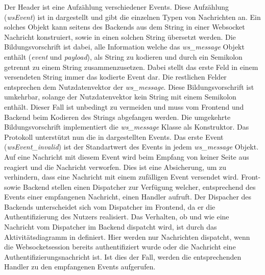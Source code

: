 Der Header ist eine Aufzählung verschiedener Events. 
Diese Aufzählung (\emph{wsEvent}) ist in  dargestellt und gibt die einzelnen Typen von Nachrichten an. 
Ein solches Objekt kann seitens des Backends aus dem String in einer Websocket Nachricht konstruiert, 
sowie in einen solchen String übersetzt werden. 
Die Bildungsvorschrift ist dabei, alle Information welche das \emph{ws\_message} Objekt enthält (\emph{event} und \emph{payload}), als String zu kodieren 
und durch ein Semikolon getrennt zu einem String zusammenzusetzen.
Dabei stellt das erste Feld in einem versendeten String immer das kodierte Event dar. Die restlichen Felder entsprechen dem Nutzdatenvektor der \emph{ws\_message}.
Diese Bildungsvorschrift ist umkehrbar, solange der Nutzdatenvektor kein String mit einem Semikolon enthält.
Dieser Fall ist unbedingt zu vermeiden und muss vom Frontend und Backend beim Kodieren des Strings abgefangen werden.
Die umgekehrte Bildungsvorschrift implementiert die \emph{ws\_message} Klasse als Konstruktor. 
Das Protokoll unterstützt nun die in  dargestellten Events.
Das erste Event (\emph{wsEvent\_invalid}) ist der Standartwert des Events in jedem \emph{ws\_message} Objekt. 
Auf eine Nachricht mit diesem Event wird beim Empfang von keiner Seite aus reagiert und die Nachricht verworfen.
Dies ist eine Absicherung, um zu verhindern, dass eine Nachricht mit einem zufälligen Event versendet wird.
Front- sowie Backend stellen einen Dispatcher zur Verfügung welcher, entsprechend des Events einer empfangenen Nachricht, einen Handler aufruft.
Der Dispacher des Backends unterscheidet sich vom Dispatcher im Frontend, da er die Authentifizierung des Nutzers realisiert.
Das Verhalten, ob und wie eine Nachricht vom Dispatcher im Backend dispatcht wird, 
ist durch das Aktivitätsdiagramm in  definiert.
Hier werden nur Nachrichten dispatcht, wenn die Websocketsession bereits authentifiziert wurde oder die Nachricht eine Authentifizierungsnachricht ist.
Ist dies der Fall, werden die entsprechenden Handler zu den empfangenen Events aufgerufen.

